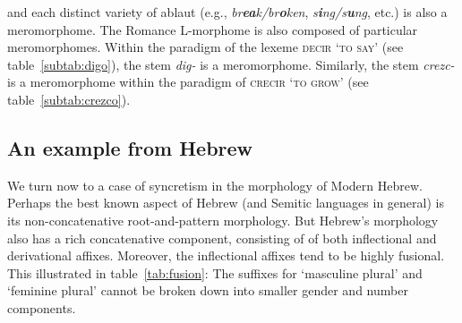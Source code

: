 and each distinct variety of ablaut (e.g., \textit{br\textbf{ea}k/br\textbf{o}ken}, \textit{s\textbf{i}ng/s\textbf{u}ng}, etc.) is also a meromorphome. 
The Romance L-morphome is also composed of particular meromorphomes. 
Within the paradigm of the lexeme \textsc{decir} \textsc{`to say'} 
(see table~\ref{subtab:digo}), the stem \textit{dig-} is a meromorphome. 
Similarly, the stem \textit{crezc-} is a meromorphome within the paradigm of 
\textsc{crecir} \textsc{`to grow'} (see table~\ref{subtab:crezco}).

\begin{table}[ht]
\centering
{}
\caption{Fusional suffixes in Hebrew nominals}
\label{tab:fusion}
\end{table}

\subsection{An example from Hebrew}
\label{sec:heb-example}
We turn now to a case of syncretism in the morphology of Modern Hebrew. Perhaps
the best known aspect of Hebrew (and Semitic languages in general) is its 
non-concatenative root-and-pattern morphology. But 
Hebrew's morphology also has a rich concatenative component, consisting of
of both inflectional and derivational affixes. 
Moreover, the inflectional affixes tend to be
highly %
fusional. This illustrated in table~\ref{tab:fusion}: The suffixes for `masculine plural' and `feminine plural'
cannot be broken down into smaller gender and number components. 

